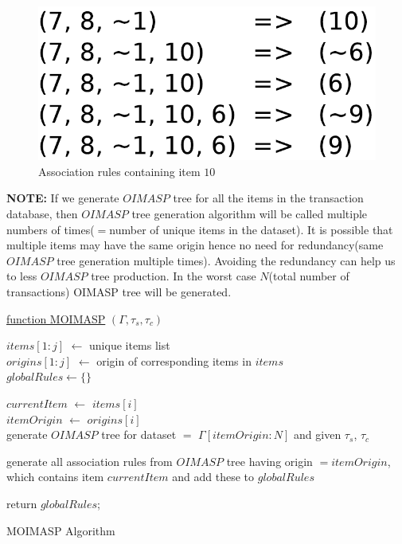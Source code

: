 \documentclass[review]{elsarticle}
\begin{document}
\begin{figure}
\begin{center}
\includegraphics[scale=0.35]{pdf/arules10}
\end{center}
\caption{Association rules containing item $ 10 $}
\label{Fig 10}
\end{figure}

\textbf{NOTE:} If we generate $ OIMASP $ tree for all the items in the transaction database, then $ OIMASP $ tree generation algorithm will be called multiple numbers of times($ = $number of unique items in the dataset). It is possible that multiple items may have the same origin hence no need for redundancy(same $ OIMASP $ tree generation multiple times). Avoiding the redundancy can help us to less $ OIMASP $ tree production. In the worst case $ N $(total number of transactions) OIMASP tree will be generated.

\begin{algorithm}

    \underline{function MOIMASP} $ (\Gamma, \tau _{s}, \tau _{c}) $\;
       
    $ items[1:j] $ $ \leftarrow $ unique items list \\
    $ origins[1:j] $ $ \leftarrow $ origin of corresponding items in $ items $ \\       
    $ globalRules \leftarrow \lbrace \rbrace $
       
	  {
		$ currentItem $ $ \leftarrow $ $ items[i] $ \\
		$ itemOrigin $ $ \leftarrow $ $ origins[i] $ \\
			  	
      	  {
            generate $ OIMASP $ tree for dataset $ = $ $ \Gamma[itemOrigin:N] $ and given $ \tau _{s} $, $ 				\tau _{c} $
          }	
          
		generate all association rules from $ OIMASP $ tree having origin $ = itemOrigin $, which contains 			item $ currentItem $ and add these to $ globalRules $
	  }
	          		
	return $ globalRules $;      
    \caption{MOIMASP Algorithm}
\end{algorithm}
\end{document}
